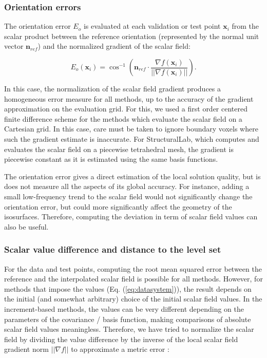 \documentclass[preprint]{ring20}
\newcommand{\bx}{\mathbf{x}}
\newcommand{\bn}{\mathbf{n}}
\begin{document}
\subsubsection{Orientation errors}

The orientation error $E_o$ is evaluated at each validation or test point $\bx_i$ from the scalar product between the reference orientation (represented by the normal unit vector $\bn_{ref}$) and the normalized gradient of the scalar field:

\begin{equation}
\label{eq:erro}
E_o(\bx_i) = \cos^{-1} \left( \bn_{ref} \cdot \frac{\nabla f(\bx_i)}{||\nabla f(\bx_i)||} \right).
\end{equation}

In this case, the normalization of the scalar field gradient produces a homogeneous error measure for all methods, up to the accuracy of the gradient approximation on the evaluation grid. For this, we used a first order centered finite difference scheme for the methods which evaluate the scalar field on a Cartesian grid. In this case, care must be taken to ignore boundary voxels where such the gradient estimate is inaccurate. For StructuralLab, which computes and evaluates the scalar field on a piecewise tetrahedral mesh, the gradient is piecewise constant as it is estimated using the same basis functions. 

The orientation error gives a direct estimation of the local solution quality, but is does not measure all the aspects of its global accuracy. For instance, adding a small low-frequency trend to the scalar field would not significantly change the orientation error, but could more significantly affect the geometry of the isosurfaces. Therefore, computing the deviation in term of scalar field values can also be useful. 

\subsubsection{Scalar value difference and distance to the level set}

For the data and test points, computing the root mean squared error between the reference and the interpolated scalar field is possible for all methods. However, for methods that impose the values (Eq. (\ref{eq:datasystem})), the result depends on the initial (and somewhat arbitrary) choice of the initial scalar field values. In the increment-based methods, the values can be very different depending on the parameters of the covariance / basis function, making comparisons of absolute scalar field values meaningless. Therefore, we have tried to normalize the scalar field by dividing the value difference by the inverse of the local scalar field gradient norm $||\nabla f||$ to approximate a metric error \citep{Caumon2010MG}: 
\end{document}
